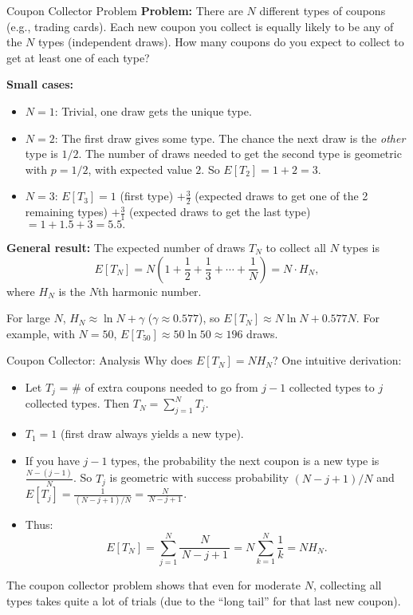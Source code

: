 \documentclass[aspectratio=169,11pt]{beamer} %
\begin{document}
\begin{frame}{Coupon Collector Problem}
\small
\textbf{Problem:} There are $N$ different types of coupons (e.g., trading cards). Each new coupon you collect is equally likely to be any of the $N$ types (independent draws). How many coupons do you expect to collect to get at least one of each type?

\textbf{Small cases:} 
\begin{itemize}
    \item $N=1$: Trivial, one draw gets the unique type.
    \item $N=2$: The first draw gives some type. The chance the next draw is the \emph{other} type is $1/2$. The number of draws needed to get the second type is geometric with $p=1/2$, with expected value $2$. So $E[T_2] = 1 + 2 = 3.$
    \item $N=3$: $E[T_3] = 1$ (first type) $+ \frac{3}{2}$ (expected draws to get one of the 2 remaining types) $+ \frac{3}{1}$ (expected draws to get the last type) $= 1 + 1.5 + 3 = 5.5.$
\end{itemize}

\textbf{General result:} The expected number of draws $T_N$ to collect all $N$ types is 
\[ E[T_N] = N \left(1 + \frac{1}{2} + \frac{1}{3} + \cdots + \frac{1}{N}\right) = N \cdot H_N, \] 
where $H_N$ is the $N$th harmonic number.

For large $N$, $H_N \approx \ln N + \gamma$ ($\gamma\approx 0.577$), so $E[T_N] \approx N \ln N + 0.577N$. For example, with $N=50$, $E[T_{50}] \approx 50 \ln 50 \approx 196$ draws.
\end{frame}

\begin{frame}{Coupon Collector: Analysis}
Why does $E[T_N] = N H_N$? One intuitive derivation:
\begin{itemize}
    \item Let $T_j$ = \# of extra coupons needed to go from $j-1$ collected types to $j$ collected types. Then $T_N = \sum_{j=1}^N T_j$.
    \item $T_1 = 1$ (first draw always yields a new type).
    \item If you have $j-1$ types, the probability the next coupon is a new type is $\frac{N-(j-1)}{N}$. So $T_j$ is geometric with success probability $(N-j+1)/N$ and $E[T_j] = \frac{1}{(N-j+1)/N} = \frac{N}{\,N-j+1\,}.$
    \item Thus:
    \[ E[T_N] = \sum_{j=1}^N \frac{N}{\,N-j+1\,} = N \sum_{k=1}^N \frac{1}{k} = N H_N. \]
\end{itemize}
The coupon collector problem shows that even for moderate $N$, collecting all types takes quite a lot of trials (due to the “long tail” for that last new coupon).
\end{frame}
\end{document}
